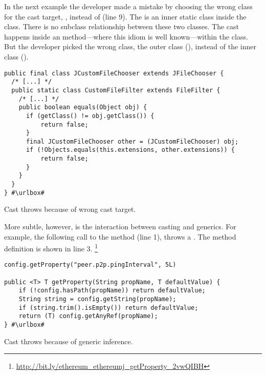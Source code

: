 In the next example the developer made a mistake by choosing the wrong class for the cast target,
\ie,  instead of  (line 9).
The  is an inner static class inside the  class.
There is no subclass relationship between these two classes.
The cast happens inside an  method---where this idiom is well known---within the  class.
But the developer picked the wrong class, the outer class (), instead of the inner class ().

\def\urlvar{http://bit.ly/GoldenGnu_jeveassets_2vsLbMr}
\begin{listing}
\begin{verbatim}
public final class JCustomFileChooser extends JFileChooser {
  /* [...] */
  public static class CustomFileFilter extends FileFilter {
    /* [...] */
    public boolean equals(Object obj) {
      if (getClass() != obj.getClass()) {
          return false;
      }
      final JCustomFileChooser other = (JCustomFileChooser) obj;
      if (!Objects.equals(this.extensions, other.extensions)) {
          return false;
      }
    }
  }
} #\urlbox#
\end{verbatim} 
\caption{Cast throws  because of wrong cast target.}
\end{listing}

More subtle, however, is the interaction between casting and generics.
For example, the following call to the  method (line 1),%
throws a .
The method definition is shown in line 3.%
\footnote{\url{http://bit.ly/ethereum_ethereumj_getProperty_2vwQIBH}}

\def\urlvar{http://bit.ly/ethereum_ethereumj_2vw4If8}
\begin{listing}
\begin{verbatim}
config.getProperty("peer.p2p.pingInterval", 5L)

public <T> T getProperty(String propName, T defaultValue) {
    if (!config.hasPath(propName)) return defaultValue;
    String string = config.getString(propName);
    if (string.trim().isEmpty()) return defaultValue;
    return (T) config.getAnyRef(propName);
} #\urlbox#
\end{verbatim}
\caption{Cast throws  because of generic inference.}
\end{listing}

